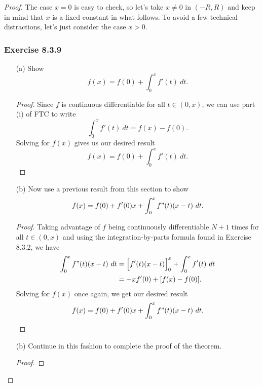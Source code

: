 \begin{proof}
The case \( x = 0  \) is easy to check, so let's take \( x \neq 0  \) in \( (-R ,R ) \) and keep in mind that \( x  \) is a fixed constant in what follows. To avoid a few technical distractions, let's just consider the case \( x > 0  \).

\subsubsection{Exercise 8.3.9} 
\begin{enumerate}
    \item[(a)] Show 
        \[  f(x) = f(0) + \int_{ 0 }^{ x }  f'(t) \  dt. \]
        \begin{proof} 
            Since \( f  \) is continuous differentiable for all  \( t \in (0,x) \), we can use part (i) of FTC to write 
        \[  \int_{ 0 }^{ x } f'(t)  \ dt =  f(x) - f(0). \] Solving for \( f(x)  \) gives us our desired result 
        \[ f(x) = f(0) + \int_{ 0 }^{ x }  f'(t) \ dt. \]
        \end{proof}
    \item[(b)] Now use a previous result from this section to show 
        \[  f(x) = f(0) + f'(0) x + \int_{ 0 }^{ x }  f"(t)(x-t) \  dt. \]
        \begin{proof}
            Taking advantage of \( f  \) being continuously differentiable \( N+1  \) times for all \(  t \in (0,x) \) and using the integration-by-parts formula found in Exercise 8.3.2, we have 
            \begin{align*}  \int_{ 0 }^{ x }  f"(t) (x -t ) \  dt &= \Big[ f'(t) (x-t) \Big]_{0}^{x} + \int_{ 0 }^{ x }  f'(t) \  dt \\
            &= -x f'(0) + [ f(x) - f(0)].  
            \end{align*}
            Solving for \( f(x)  \) once again, we get our desired result
        \[  f(x) = f(0) + f'(0) x + \int_{ 0 }^{ x }  f"(t)(x-t) \  dt. \]
        \end{proof}
    \item[(b)] Continue in this fashion to complete the proof of the theorem.
        \begin{proof}
        
        \end{proof}
\end{enumerate}

\end{proof}




